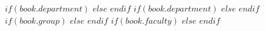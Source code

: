 {} %
\examiner{} %
{} %
\author{$author$} %
\addresses{} %

\subject{} %
\keywords{} %
$if(book.department)$
$else$\university{}
$endif$
$if(book.department)$
$else$\department{}
$endif$
$if(book.group)$
$else$\group{}
$endif$
$if(book.faculty)$
$else$
\faculty{}$endif$